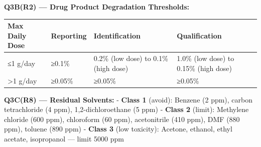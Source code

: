 \documentclass[
  11pt,
  a4paper,
]{report}
\begin{document}
\textbf{Q3B(R2) --- Drug Product Degradation Thresholds:}

\begin{longtable}[]{@{}llll@{}}
\toprule
\begin{minipage}[b]{0.24\columnwidth}\raggedright
Max Daily Dose\strut
\end{minipage} & \begin{minipage}[b]{0.17\columnwidth}\raggedright
Reporting\strut
\end{minipage} & \begin{minipage}[b]{0.24\columnwidth}\raggedright
Identification\strut
\end{minipage} & \begin{minipage}[b]{0.23\columnwidth}\raggedright
Qualification\strut
\end{minipage}\tabularnewline
\midrule
\endhead
\begin{minipage}[t]{0.24\columnwidth}\raggedright
≤1 g/day\strut
\end{minipage} & \begin{minipage}[t]{0.17\columnwidth}\raggedright
≥0.1\%\strut
\end{minipage} & \begin{minipage}[t]{0.24\columnwidth}\raggedright
0.2\% (low dose) to 0.1\% (high dose)\strut
\end{minipage} & \begin{minipage}[t]{0.23\columnwidth}\raggedright
1.0\% (low dose) to 0.15\% (high dose)\strut
\end{minipage}\tabularnewline
\begin{minipage}[t]{0.24\columnwidth}\raggedright
\textgreater1 g/day\strut
\end{minipage} & \begin{minipage}[t]{0.17\columnwidth}\raggedright
≥0.05\%\strut
\end{minipage} & \begin{minipage}[t]{0.24\columnwidth}\raggedright
≥0.05\%\strut
\end{minipage} & \begin{minipage}[t]{0.23\columnwidth}\raggedright
≥0.05\%\strut
\end{minipage}\tabularnewline
\bottomrule
\end{longtable}

\textbf{Q3C(R8) --- Residual Solvents:} - \textbf{Class 1} (avoid):
Benzene (2 ppm), carbon tetrachloride (4 ppm), 1,2-dichloroethane (5
ppm) - \textbf{Class 2} (limit): Methylene chloride (600 ppm),
chloroform (60 ppm), acetonitrile (410 ppm), DMF (880 ppm), toluene (890
ppm) - \textbf{Class 3} (low toxicity): Acetone, ethanol, ethyl acetate,
isopropanol --- limit 5000 ppm
\end{document}
